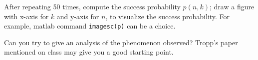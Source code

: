 \documentclass[11pt]{article}
\begin{document}
\begin{enumerate}
After repeating 50 times, compute the success probability $p(n,k)$; draw a figure with x-axis for $k$ and y-axis for $n$, to visualize the success probability. For example, matlab command {\tt{imagesc(p)}} can be a choice. 

Can you try to give an analysis of the phenomenon observed? Tropp's paper mentioned on class may give you a good starting point. 

%
%
%
%


\end{enumerate}
\end{document}
